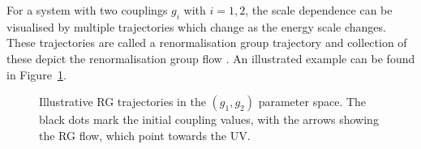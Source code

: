 For a system with two couplings $g_i$ with $i=1,2$, the scale dependence can be visualised by multiple trajectories which change as the energy scale changes. These trajectories are called a renormalisation group trajectory and collection of these depict the renormalisation group flow \cite{Lancaster:2014}. An illustrated example can be found in Figure~\ref{fig:RGflow}. 
\begin{figure}[htbp]
    \centering
        \vspace{0.5cm} %
        \caption{Illustrative RG trajectories in the $(g_1,g_2)$ parameter space. The black dots mark the initial coupling values, with the arrows showing the RG flow, which point towards the UV.} 
        \label{fig:RGflow}
\end{figure}

